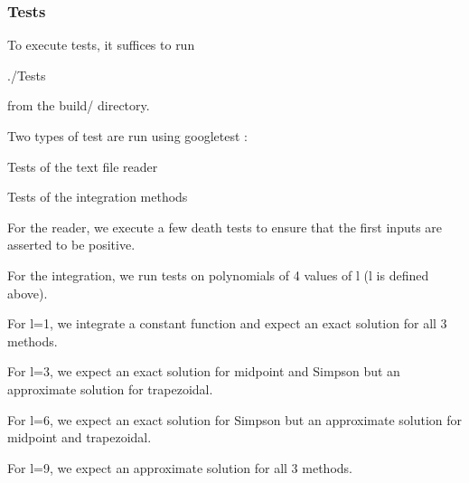 \subsubsection*{Tests}

To execute tests, it suffices to run 
\begin{DoxyCode}
./Tests
\end{DoxyCode}
 from the {\ttfamily build/} directory.

Two types of test are run using googletest \+:
\begin{DoxyItemize}
\item Tests of the text file reader
\item Tests of the integration methods
\end{DoxyItemize}

For the reader, we execute a few death tests to ensure that the first inputs are asserted to be positive.

For the integration, we run tests on polynomials of 4 values of l (l is defined above).
\begin{DoxyItemize}
\item For l=1, we integrate a constant function and expect an exact solution for all 3 methods.
\item For l=3, we expect an exact solution for midpoint and Simpson but an approximate solution for trapezoidal.
\item For l=6, we expect an exact solution for Simpson but an approximate solution for midpoint and trapezoidal.
\item For l=9, we expect an approximate solution for all 3 methods. 
\end{DoxyItemize}